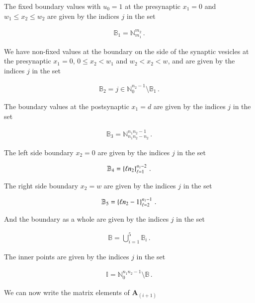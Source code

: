 \documentclass[11pt,english,a4paper]{article}
\begin{document}
\begin{flushleft}
The fixed boundary values with $u_0=1$ at the presynaptic $x_1=0$ and $w_1 \leq x_2 \leq w_2$ are given by the indices $j$ in the set

\begin{align*}
\mathbb{B}_1 = \mathbb{N}_{m_1}^{m_2}\,.
\end{align*}

We have non-fixed values at the boundary on the side of the synaptic vesicles at the presynaptic $x_1=0$, $0 \leq x_2 < w_1$ and $w_2 < x_2 < w$, and are given by the indices $j$ in the set

\begin{align*}
\mathbb{B}_2 = j\in\mathbb{N}_0^{n_2-1} \setminus \mathbb{B}_1 \,.
\end{align*}

The boundary values at the postsynaptic $x_1=d$ are given by the indices $j$ in the set

\begin{align*}
\mathbb{B}_3 = \mathbb{N}_{n_1 n_2 - n_2}^{n_1 n_2 - 1} \,.
\end{align*}

The left side boundary $x_2=0$ are given by the indices $j$ in the set

\begin{align*}
\mathbb{B}_4 = \left\lbrace{\ell n_2}\right\rbrace_{\ell=1}^{n_1-2} \,.
\end{align*}

The right side boundary $x_2=w$ are given by the indices $j$ in the set

\begin{align*}
\mathbb{B}_5 = \left\lbrace{\ell n_2 - 1}\right\rbrace_{\ell=2}^{n_1-1}\,.
\end{align*}

And the boundary as a whole are given by the indices $j$ in the set

\begin{align*}
\mathbb{B} = \bigcup_{i=1}^5 \mathbb{B}_i \,.
\end{align*}

The inner points are given by the indices $j$ in the set

\begin{align*}
\mathbb{I} = \mathbb{N}_{0}^{n_1 n_2 -1} \setminus \mathbb{B}\,.
\end{align*}

We can now write the matrix elements of $\textbf{A}_{(i+1)}$


\end{flushleft}
\end{document}
